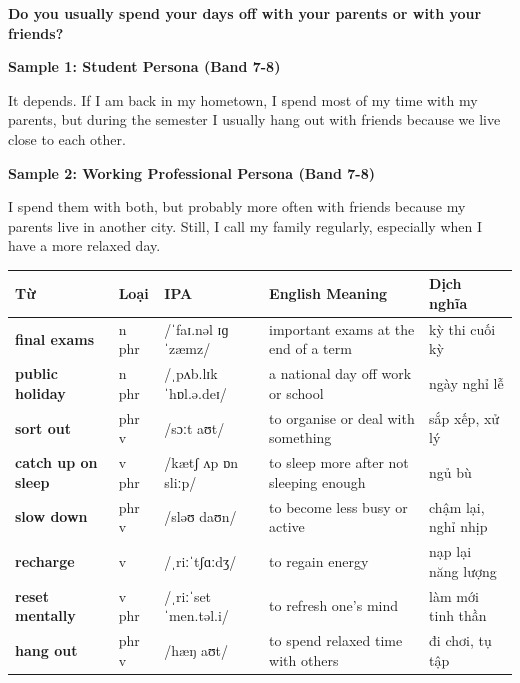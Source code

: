 \separator

\begin{ieltsquestion}
\textbf{Do you usually spend your days off with your parents or with your friends?}
\end{ieltsquestion}
\textbf{Sample 1: Student Persona (Band 7-8)}

It depends. If I am back in my hometown, I spend most of my time with my parents, but during the semester I usually hang out with friends because we live close to each other.

\textbf{Sample 2: Working Professional Persona (Band 7-8)}

I spend them with both, but probably more often with friends because my parents live in another city. Still, I call my family regularly, especially when I have a more relaxed day.

\separator


\vspace{0.8em}
\begin{center}
\renewcommand{\arraystretch}{1.65}
\begin{tabularx}{\textwidth}{|V{0.22\textwidth}|C{0.07\textwidth}|I{0.20\textwidth}|Y|V{0.18\textwidth}|}
\hline
{}
\textbf{Từ} & \textbf{Loại} & \textbf{IPA} & \textbf{English Meaning} & \textbf{Dịch nghĩa} \\
\hline
\textbf{final exams} & n phr & /ˈfaɪ.nəl ɪɡˈzæmz/ & important exams at the end of a term & kỳ thi cuối kỳ \\ \hline
\textbf{public holiday} & n phr & /ˌpʌb.lɪk ˈhɒl.ə.deɪ/ & a national day off work or school & ngày nghỉ lễ \\ \hline
\textbf{sort out} & phr v & /sɔːt aʊt/ & to organise or deal with something & sắp xếp, xử lý \\ \hline
\textbf{catch up on sleep} & v phr & /kætʃ ʌp ɒn sliːp/ & to sleep more after not sleeping enough & ngủ bù \\ \hline
\textbf{slow down} & phr v & /sləʊ daʊn/ & to become less busy or active & chậm lại, nghỉ nhịp \\ \hline
\textbf{recharge} & v & /ˌriːˈtʃɑːdʒ/ & to regain energy & nạp lại năng lượng \\ \hline
\textbf{reset mentally} & v phr & /ˌriːˈset ˈmen.təl.i/ & to refresh one's mind & làm mới tinh thần \\ \hline
\textbf{hang out} & phr v & /hæŋ aʊt/ & to spend relaxed time with others & đi chơi, tụ tập \\ \hline
\end{tabularx}
\end{center}

